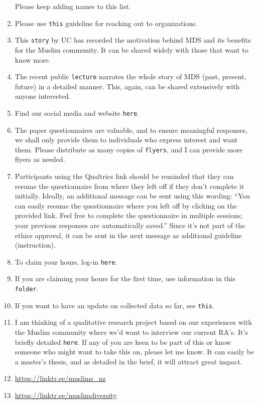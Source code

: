 \documentclass[
]{interact}
\begin{document}
\begin{enumerate}
  Please keep adding names to this list.
\item
  Please use \texttt{this} guideline for reaching out to organizations.
\item
  This \texttt{story} by UC has recorded the motivation behind MDS and
  its benefits for the Muslim community. It can be shared widely with
  those that want to know more.
\item
  The recent public \texttt{lecture} narrates the whole story of MDS
  (past, present, future) in a detailed manner. This, again, can be
  shared extensively with anyone interested.
\item
  Find our social media and website \texttt{here}.
\item
  The paper questionnaires are valuable, and to ensure meaningful
  responses, we shall only provide them to individuals who express
  interest and want them. Please distribute as many copies of
  \texttt{flyers}, and I can provide more flyers as needed.
\item
  Participants using the Qualtrics link should be reminded that they can
  resume the questionnaire from where they left off if they don't
  complete it initially. Ideally, an additional message can be sent
  using this wording: ``You can easily resume the questionnaire where
  you left off by clicking on the provided link. Feel free to complete
  the questionnaire in multiple sessions; your previous responses are
  automatically saved.'' Since it's not part of the ethics approval, it
  can be sent in the next message as additional guideline (instruction).
\item
  To claim your hours, log-in \texttt{here}.
\item
  If you are claiming your hours for the first time, use information in
  this \texttt{folder}.
\item
  If you want to have an update on collected data so far, see
  \texttt{this}.
\item
  I am thinking of a qualitative research project based on our
  experiences with the Muslim community where we'd want to interview our
  current RA's. It's briefly detailed \texttt{here}. If any of you are
  keen to be part of this or know someone who might want to take this
  on, please let me know. It can easily be a master's thesis, and as
  detailed in the brief, it will attract great impact.
\item
  \url{https://linktr.ee/muslims_nz}
\item
  \url{https://linktr.ee/muslimdiversity}
\end{enumerate}
\end{document}
